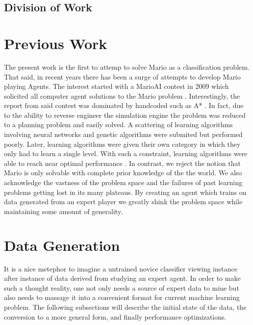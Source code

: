 \documentclass[]{article}   %
\begin{document}
\subsection{Division of Work}

\section{Previous Work}
\label{sec:prevwork}
The present work is the first to attemp to solve Mario as a classification problem.  That said, in recent years there has been a surge of attempts to develop Mario playing Agents.  The interest started with a MarioAI contest in 2009 which solicited all computer agent solutions to the Mario problem \cite{2}.  Interestingly, the report from said contest was dominated by handcoded such as A* \cite{3}.  In fact, due to the ability to reverse engineer the simulation engine the problem was reduced to a planning problem and easily solved.  A scattering of learning algorithms involving neural networks and genetic algorithms were submited but performed poorly.  Later, learning algorithms were given their own category in which they only had to learn a single level. With such a constraint, learning algorithms were able to reach near optimal performance \cite{me}. In contrast, we reject the notion that Mario is only solvable with complete prior knowledge of the the world.  We also acknowledge the vastness of the problem space and the failures of past learning problems getting lost in its many plateaus.  By creating an agent which trains on data generated from an expert player we greatly shink the problem space while maintaining some amount of generality.  



\section{Data Generation}     %
\label{sec:datagen}
It is a nice metephor to imagine a untrained novice classifier viewing instance after instance of data derived from studying an expert agent.  In order to make such a thought reality, one not only needs a source of expert data to mine but also needs to massage it into a convenient format for current machine learning problem.  The following subsections will describe the initial state of the data, the conversion to a more general form, and finally performance optimizations.
\end{document}
